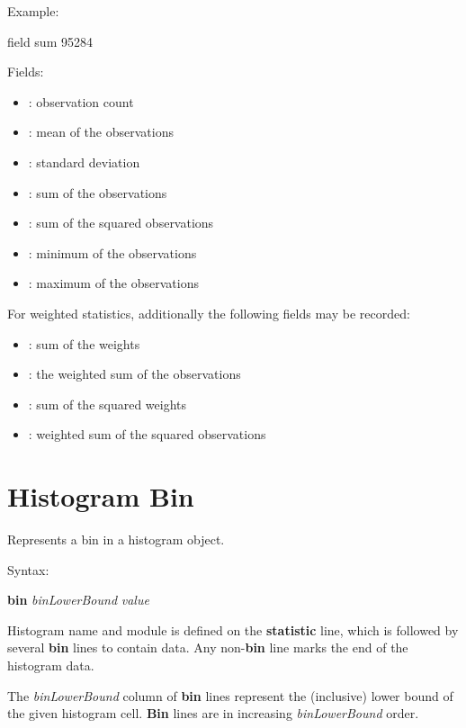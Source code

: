 Example:

\begin{filelisting}
field sum 95284
\end{filelisting}

Fields:

\begin{itemize}
    \item {}: observation count
    \item {}: mean of the observations
    \item {}: standard deviation
    \item {}: sum of the observations
    \item {}: sum of the squared observations
    \item {}: minimum of the observations
    \item {}: maximum of the observations
\end{itemize}

For weighted statistics, additionally the following fields may be recorded:

\begin{itemize}
    \item {}: sum of the weights
    \item {}: the weighted sum of the observations
    \item {}:  sum of the squared weights
    \item {}: weighted sum of the squared observations
\end{itemize}



\section{Histogram Bin}
\label{sec:result-file-formats:histogram-bin}

Represents a bin in a histogram object.

Syntax:

\hspace{20mm} \textbf{bin} \textit{binLowerBound} \textit{value}

Histogram name and module is defined on the \textbf{statistic} line,
which is followed by several \textbf{bin} lines to contain data. Any
non{}-\textbf{bin} line marks the end of the histogram data.

The \textit{binLowerBound} column of \textbf{bin} lines represent the
(inclusive) lower bound of the given histogram cell. \textbf{Bin} lines are in
increasing \textit{binLowerBound} order.

